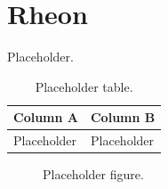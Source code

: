 \chapter{Rheon}
\label{chap:rheon}

Placeholder.

\begin{table}[ht]
\caption{Placeholder table.}
\label{tab:placeholder}
\centering
\begin{tabular}{@{}ll@{}}
\toprule
\textbf{Column A} & \textbf{Column B} \\
\midrule
Placeholder & Placeholder \\
\bottomrule
\end{tabular}
\end{table}

\begin{figure}[ht]
\centering
{}
\caption{Placeholder figure.}
\label{fig:placeholder}
\end{figure}
